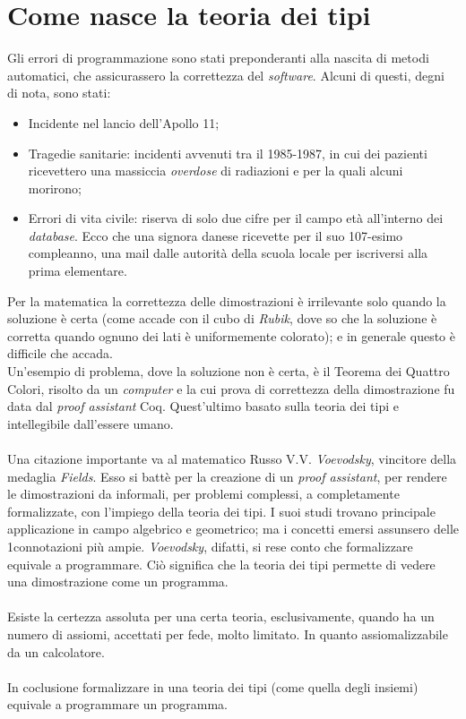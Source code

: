 \documentclass[10pt,a4paper, italian]{book}
\begin{document}
\section{Come nasce la teoria dei tipi}
\label{sec:come-nasce}
Gli errori di programmazione sono stati preponderanti alla nascita di metodi automatici, che assicurassero la correttezza del \textit{software}. Alcuni di questi, degni di nota, sono stati:
\begin{itemize}
\item Incidente nel lancio dell'Apollo 11;
\item Tragedie sanitarie: incidenti avvenuti tra il 1985-1987, in cui dei pazienti ricevettero una massiccia \textit{overdose} di radiazioni e per la quali alcuni morirono;
\item Errori di vita civile: riserva di solo due cifre per il campo et\`a all'interno dei \textit{database}. Ecco che una signora danese ricevette per il suo 107-esimo compleanno, una mail dalle autorit\`a della scuola locale per iscriversi alla prima elementare.
\end{itemize}
\noindent 
Per la matematica la correttezza delle dimostrazioni \`e irrilevante solo quando la soluzione \`e certa (come accade con il cubo di \textit{Rubik}, dove so che la soluzione \`e corretta quando ognuno dei lati \`e uniformemente colorato); e in generale questo \`e difficile che accada.\\
Un'esempio di problema, dove la soluzione non \`e certa, \`e il Teorema dei Quattro Colori, risolto da un \textit{computer} e la cui prova di correttezza della dimostrazione fu data dal \textit{proof assistant} Coq. Quest'ultimo basato sulla teoria dei tipi e intellegibile dall'essere umano.\\\\
Una citazione importante va al matematico Russo V.V. \textit{Voevodsky}, vincitore della medaglia \textit{ Fields}. Esso si batt\`e per la creazione di un \textit{proof assistant}, per rendere le dimostrazioni da informali, per problemi complessi, a completamente formalizzate, con l'impiego della teoria dei tipi. I suoi studi trovano principale applicazione in campo algebrico e geometrico; ma i concetti emersi assunsero delle 1connotazioni pi\`u ampie. \textit{Voevodsky}, difatti, si rese conto che formalizzare equivale a programmare. Ci\`o significa che la teoria dei tipi permette di vedere una dimostrazione come un programma.
\\\\
Esiste la certezza assoluta per una certa teoria, esclusivamente, quando ha un numero di assiomi, accettati per fede, molto limitato. In quanto assiomalizzabile da un calcolatore.
\\\\
In coclusione formalizzare in una teoria dei tipi (come quella degli insiemi) equivale a programmare un programma.
\end{document}
